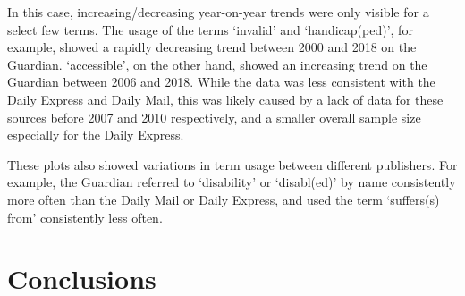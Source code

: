\documentclass{report}
\begin{document}
In this case, increasing/decreasing year-on-year trends were only visible for a select few terms.
The usage of the terms `invalid' and `handicap(ped)', for example, showed a rapidly decreasing trend between 2000 and 2018 on the Guardian.
`accessible', on the other hand, showed an increasing trend on the Guardian between 2006 and 2018.
While the data was less consistent with the Daily Express and Daily Mail, this was likely caused by a lack of data for these sources before 2007 and 2010 respectively, and a smaller overall sample size especially for the Daily Express.

These plots also showed variations in term usage between different publishers.
For example, the Guardian referred to `disability' or `disabl(ed)' by name consistently more often than the Daily Mail or Daily Express, and used the term `suffers(s) from' consistently less often.






\chapter{Conclusions} \label{Conclusions}  %

\end{document}
